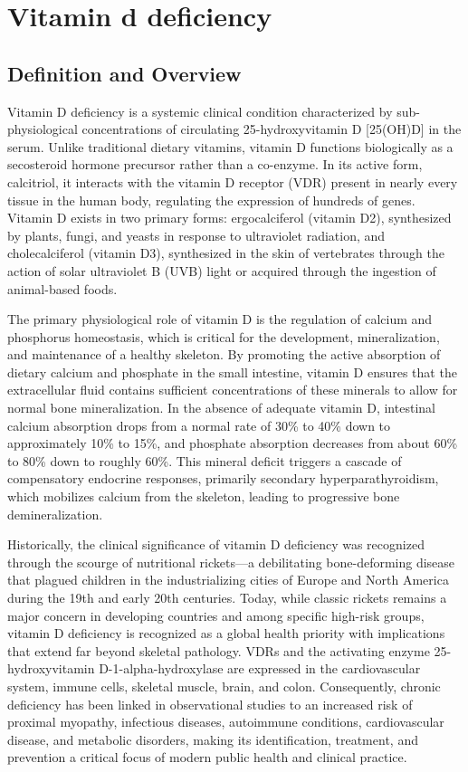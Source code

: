 \chapter{Vitamin d deficiency}

\section*{Definition and Overview}
Vitamin D deficiency is a systemic clinical condition characterized by sub-physiological concentrations of circulating 25-hydroxyvitamin D [25(OH)D] in the serum. Unlike traditional dietary vitamins, vitamin D functions biologically as a secosteroid hormone precursor rather than a co-enzyme. In its active form, calcitriol, it interacts with the vitamin D receptor (VDR) present in nearly every tissue in the human body, regulating the expression of hundreds of genes. Vitamin D exists in two primary forms: ergocalciferol (vitamin D2), synthesized by plants, fungi, and yeasts in response to ultraviolet radiation, and cholecalciferol (vitamin D3), synthesized in the skin of vertebrates through the action of solar ultraviolet B (UVB) light or acquired through the ingestion of animal-based foods.

The primary physiological role of vitamin D is the regulation of calcium and phosphorus homeostasis, which is critical for the development, mineralization, and maintenance of a healthy skeleton. By promoting the active absorption of dietary calcium and phosphate in the small intestine, vitamin D ensures that the extracellular fluid contains sufficient concentrations of these minerals to allow for normal bone mineralization. In the absence of adequate vitamin D, intestinal calcium absorption drops from a normal rate of 30\% to 40\% down to approximately 10\% to 15\%, and phosphate absorption decreases from about 60\% to 80\% down to roughly 60\%. This mineral deficit triggers a cascade of compensatory endocrine responses, primarily secondary hyperparathyroidism, which mobilizes calcium from the skeleton, leading to progressive bone demineralization.

Historically, the clinical significance of vitamin D deficiency was recognized through the scourge of nutritional rickets—a debilitating bone-deforming disease that plagued children in the industrializing cities of Europe and North America during the 19th and early 20th centuries. Today, while classic rickets remains a major concern in developing countries and among specific high-risk groups, vitamin D deficiency is recognized as a global health priority with implications that extend far beyond skeletal pathology. VDRs and the activating enzyme 25-hydroxyvitamin D-1-alpha-hydroxylase are expressed in the cardiovascular system, immune cells, skeletal muscle, brain, and colon. Consequently, chronic deficiency has been linked in observational studies to an increased risk of proximal myopathy, infectious diseases, autoimmune conditions, cardiovascular disease, and metabolic disorders, making its identification, treatment, and prevention a critical focus of modern public health and clinical practice.


